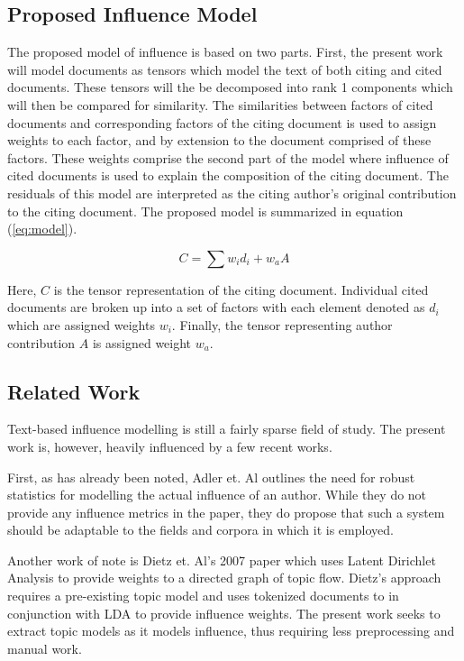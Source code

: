 \documentclass{article}
\begin{document}
\subsection{Proposed Influence Model}
The proposed model of influence is based on two parts.  First, the
present work will model documents as tensors which model the text of
both citing and cited documents. These tensors will the be decomposed
into rank 1 components which will then be compared for similarity.
The similarities between factors of cited documents and corresponding
factors of the citing document is used to assign weights to each
factor, and by extension to the document comprised of these factors.
These weights comprise the second part of the model where influence of
cited documents is used to explain the composition of the citing
document.  The residuals of this model are interpreted as the citing
author's original contribution to the citing document. The proposed
model is summarized in equation (\ref{eq:model}). 

\begin{equation}
    \label{eq:model}
    C = \sum w_id_i + w_a A
\end{equation}

Here, $C$ is the tensor representation of the citing document.
Individual cited documents are broken up into a set of factors with
each element denoted as $d_i$ which are assigned weights $w_i$.  Finally,
the tensor representing author contribution $A$ is assigned weight
$w_a$.  

\subsection{Related Work}
Text-based influence modelling is still a fairly sparse field of
study.  The present work is, however, heavily influenced by a few
recent works.

First, as has already been noted, Adler et. Al \cite{addler2009}
outlines the need for robust statistics for modelling the actual
influence of an author.  While they do not provide any influence
metrics in the paper, they do propose that such a system should be
adaptable to the fields and corpora in which it is employed.

Another work of note is Dietz et. Al's 2007 paper \cite{dietz2007} which uses
Latent Dirichlet Analysis \cite{blei2003} to provide weights to
a directed graph of topic flow.  Dietz's approach requires
a pre-existing topic model and uses tokenized documents to in
conjunction with LDA to provide influence weights.  The present work
seeks to extract topic models as it models influence, thus requiring
less preprocessing and manual work.
\end{document}
